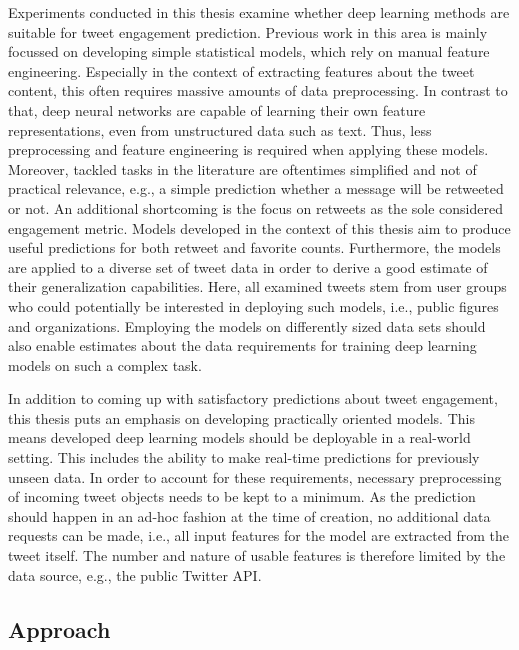 Experiments conducted in this thesis examine whether deep learning methods are
suitable for tweet engagement prediction.
Previous work in this area is mainly focussed on developing simple statistical
models, which rely on manual feature engineering.
Especially in the context of extracting features about the tweet content, this
often requires massive amounts of data preprocessing.
In contrast to that, deep neural networks are capable of learning their own 
feature representations, even from unstructured data such as text.
Thus, less preprocessing and feature engineering is required when applying
these models.
Moreover, tackled tasks in the literature are oftentimes simplified and not of 
practical relevance, e.g., a simple prediction whether a message will be 
retweeted or not.
An additional shortcoming is the focus on retweets as the sole considered
engagement metric.
Models developed in the context of this thesis aim to produce useful predictions
for both retweet and favorite counts.
Furthermore, the models are applied to a diverse set of tweet data in order
to derive a good estimate of their generalization capabilities.
Here, all examined tweets stem from user groups who could potentially be interested
in deploying such models, i.e., public figures and organizations.
Employing the models on differently sized data sets should also enable estimates
about the data requirements for training deep learning models on such a complex
task.

In addition to coming up with satisfactory predictions about tweet engagement,
this thesis puts an emphasis on developing practically oriented models.
This means developed deep learning models should be deployable in a real-world
setting.
This includes the ability to make real-time predictions for previously unseen
data.
In order to account for these requirements, necessary preprocessing of incoming
tweet objects needs to be kept to a minimum.
As the prediction should happen in an ad-hoc fashion at the time of creation,
no additional data requests can be made, i.e., all input features for the model
are extracted from the tweet itself.
The number and nature of usable features is therefore limited by the data source,
e.g., the public Twitter API.

\subsection{Approach}
\label{sec:approach}

